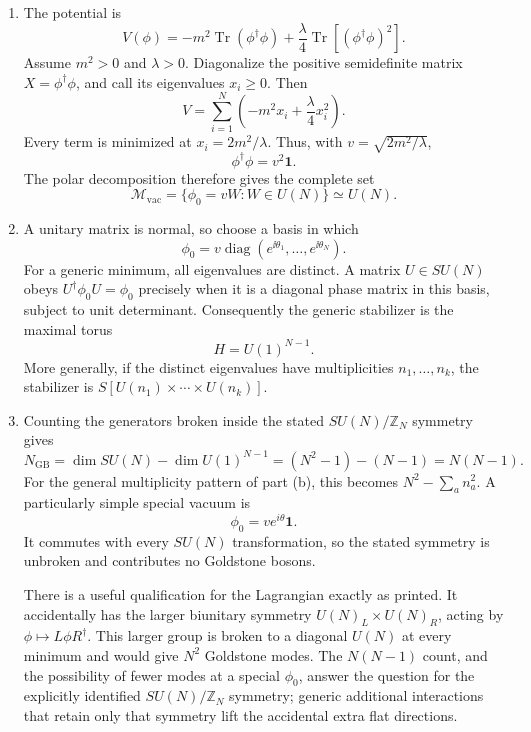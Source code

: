 \begin{enumerate}
  \begin{enumerate}
    \item[(a)]
    The potential is
    \[
      V(\phi)=-m^2\operatorname{Tr}(\phi^\dagger\phi)
        +\frac\lambda4
          \operatorname{Tr}\!\left[(\phi^\dagger\phi)^2\right].
    \]
    Assume \(m^2>0\) and \(\lambda>0\).  Diagonalize the positive
    semidefinite matrix \(X=\phi^\dagger\phi\), and call its eigenvalues
    \(x_i\geq0\).  Then
    \[
      V=\sum_{i=1}^N\left(-m^2x_i+\frac\lambda4x_i^2\right).
    \]
    Every term is minimized at \(x_i=2m^2/\lambda\).  Thus, with
    \(v=\sqrt{2m^2/\lambda}\),
    \[
      \phi^\dagger\phi=v^2\mathbf1.
    \]
    The polar decomposition therefore gives the complete set
    \[
      \boxed{\mathcal M_{\mathrm{vac}}
        =\{\phi_0=vW:W\in U(N)\}\simeq U(N).}
    \]

    \item[(b)]
    A unitary matrix is normal, so choose a basis in which
    \[
      \phi_0=v\operatorname{diag}
        (e^{\ii\theta_1},\ldots,e^{\ii\theta_N}).
    \]
    For a generic minimum, all eigenvalues are distinct.  A matrix
    \(U\in SU(N)\) obeys \(U^\dagger\phi_0U=\phi_0\) precisely when it is a
    diagonal phase matrix in this basis, subject to unit determinant.
    Consequently the generic stabilizer is the maximal torus
    \[
      \boxed{H=U(1)^{N-1}.}
    \]
    More generally, if the distinct eigenvalues have multiplicities
    \(n_1,\ldots,n_k\), the stabilizer is
    \(S[U(n_1)\times\cdots\times U(n_k)]\).

    \item[(c)]
    Counting the generators broken inside the stated \(SU(N)/\mathbb Z_N\)
    symmetry gives
    \[
      \boxed{N_{\mathrm{GB}}
        =\dim SU(N)-\dim U(1)^{N-1}
        =(N^2-1)-(N-1)=N(N-1).}
    \]
    For the general multiplicity pattern of part (b), this becomes
    \(N^2-\sum_a n_a^2\).  A particularly simple special vacuum is
    \[
      \phi_0=ve^{i\theta}\mathbf1.
    \]
    It commutes with every \(SU(N)\) transformation, so the stated symmetry
    is unbroken and contributes no Goldstone bosons.

    There is a useful qualification for the Lagrangian exactly as printed.
    It accidentally has the larger biunitary symmetry
    \(U(N)_L\times U(N)_R\), acting by
    \(\phi\mapsto L\phi R^\dagger\).  This larger group is broken to a
    diagonal \(U(N)\) at every minimum and would give \(N^2\) Goldstone
    modes.  The \(N(N-1)\) count, and the possibility of fewer modes at a
    special \(\phi_0\), answer the question for the explicitly identified
    \(SU(N)/\mathbb Z_N\) symmetry; generic additional interactions that
    retain only that symmetry lift the accidental extra flat directions.
  \end{enumerate}


\end{enumerate}
